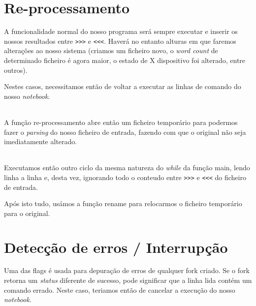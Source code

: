 \documentclass[11pt,a4paper]{report}
\begin{document}
\section{Re-processamento}

A funcionalidade normal do nosso programa será sempre executar e inserir os nossos resultados entre \verb|>>>| e \verb|<<<|.
Haverá no entanto alturas em que faremos alterações ao nosso sistema (criamos um ficheiro novo, o \textit{word count} de determinado ficheiro é agora maior, o estado de X dispositivo foi alterado, entre outros). 

Nestes casos, necessitamos então de voltar a executar as linhas de comando do nosso \textit{notebook}.



~\\

A função re-processamento abre então um ficheiro temporário para podermos fazer o \textit{parsing} do nosso ficheiro de entrada, fazendo com que o original não seja imediatamente alterado.


~\\

Executamos então outro ciclo da mesma natureza do \textit{while} da função main, lendo linha a linha e, desta vez, ignorando todo o conteudo entre \verb|>>>| e \verb|<<<| do ficheiro de entrada.

Após isto tudo, usámos a função rename para relocarmos o ficheiro temporário para o original.



\pagebreak
\section{Detecção de erros / Interrupção}



Uma das flags é usada para depuração de erros de qualquer fork criado. Se o fork retorna um \textit{status} diferente de sucesso, pode significar que a linha lida contém um comando errado.
Neste caso, teriamos então de cancelar a execução do nosso \textit{notebook}.
\end{document}
